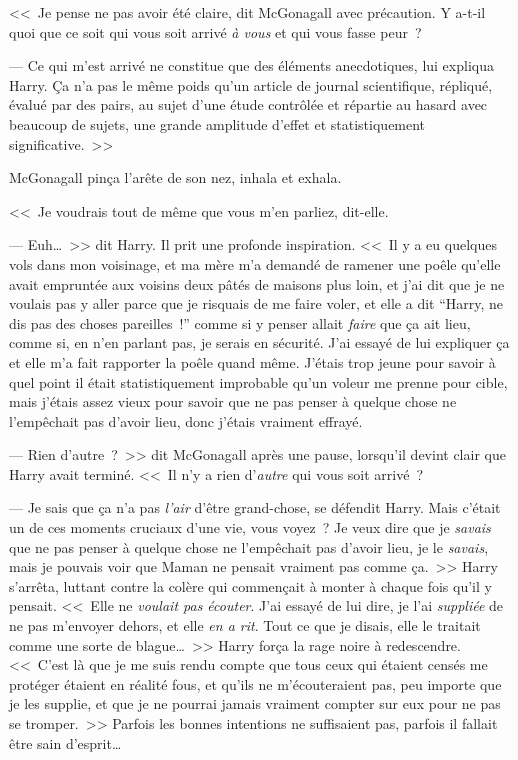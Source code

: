 <<~Je pense ne pas avoir été claire, dit McGonagall avec précaution. Y a-t-il quoi que ce soit qui vous soit arrivé \emph{à vous} et qui vous fasse peur~?

--- Ce qui m'est arrivé ne constitue que des éléments anecdotiques, lui expliqua Harry. Ça n'a pas le même poids qu'un article de journal scientifique, répliqué, évalué par des pairs, au sujet d'une étude contrôlée et répartie au hasard avec beaucoup de sujets, une grande amplitude d'effet et statistiquement significative.~>>

McGonagall pinça l'arête de son nez, inhala et exhala. 

<<~Je voudrais tout de même que vous m'en parliez, dit-elle.

--- Euh…~>> dit Harry. Il prit une profonde inspiration. <<~Il y a eu quelques vols dans mon voisinage, et ma mère m'a demandé de ramener une poêle qu'elle avait empruntée aux voisins deux pâtés de maisons plus loin, et j'ai dit que je ne voulais pas y aller parce que je risquais de me faire voler, et elle a dit “Harry, ne dis pas des choses pareilles~!” comme si y penser allait \emph{faire} que ça ait lieu, comme si, en n'en parlant pas, je serais en sécurité. J'ai essayé de lui expliquer ça et elle m'a fait rapporter la poêle quand même. J'étais trop jeune pour savoir à quel point il était statistiquement improbable qu'un voleur me prenne pour cible, mais j'étais assez vieux pour savoir que ne pas penser à quelque chose ne l'empêchait pas d'avoir lieu, donc j'étais vraiment effrayé.

--- Rien d'autre~?~>> dit McGonagall après une pause, lorsqu'il devint clair que Harry avait terminé. <<~Il n'y a rien d'\emph{autre} qui vous soit arrivé~?

--- Je sais que ça n'a pas \emph{l'air} d'être grand-chose, se défendit Harry. Mais c'était un de ces moments cruciaux d'une vie, vous voyez~? Je veux dire que je \emph{savais} que ne pas penser à quelque chose ne l'empêchait pas d'avoir lieu, je le \emph{savais}, mais je pouvais voir que Maman ne pensait vraiment pas comme ça.~>> Harry s'arrêta, luttant contre la colère qui commençait à monter à chaque fois qu'il y pensait. <<~Elle ne \emph{voulait pas écouter}. J'ai essayé de lui dire, je l'ai \emph{suppliée} de ne pas m'envoyer dehors, et elle \emph{en a rit}. Tout ce que je disais, elle le traitait comme une sorte de blague…~>> Harry força la rage noire à redescendre. <<~C'est là que je me suis rendu compte que tous ceux qui étaient censés me protéger étaient en réalité fous, et qu'ils ne m'écouteraient pas, peu importe que je les supplie, et que je ne pourrai jamais vraiment compter sur eux pour ne pas se tromper.~>> Parfois les bonnes intentions ne suffisaient pas, parfois il fallait être sain d'esprit…

